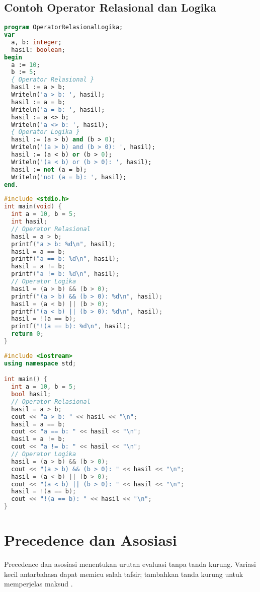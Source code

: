 \documentclass[../main.tex]{subfiles}
\begin{document}
\subsection{Contoh Operator Relasional dan Logika}
\begin{lstlisting}[language=Pascal, caption={Operator relasional dan logika di Pascal}]
program OperatorRelasionalLogika;
var
  a, b: integer;
  hasil: boolean;
begin
  a := 10;
  b := 5;
  { Operator Relasional }
  hasil := a > b;
  Writeln('a > b: ', hasil);
  hasil := a = b;
  Writeln('a = b: ', hasil);
  hasil := a <> b;
  Writeln('a <> b: ', hasil);
  { Operator Logika }
  hasil := (a > b) and (b > 0);
  Writeln('(a > b) and (b > 0): ', hasil);
  hasil := (a < b) or (b > 0);
  Writeln('(a < b) or (b > 0): ', hasil);
  hasil := not (a = b);
  Writeln('not (a = b): ', hasil);
end.
\end{lstlisting}

\begin{lstlisting}[language=C, caption={Operator relasional dan logika di C}]
#include <stdio.h>
int main(void) {
  int a = 10, b = 5;
  int hasil;
  // Operator Relasional
  hasil = a > b;
  printf("a > b: %d\n", hasil);
  hasil = a == b;
  printf("a == b: %d\n", hasil);
  hasil = a != b;
  printf("a != b: %d\n", hasil);
  // Operator Logika
  hasil = (a > b) && (b > 0);
  printf("(a > b) && (b > 0): %d\n", hasil);
  hasil = (a < b) || (b > 0);
  printf("(a < b) || (b > 0): %d\n", hasil);
  hasil = !(a == b);
  printf("!(a == b): %d\n", hasil);
  return 0;
}
\end{lstlisting}

\begin{lstlisting}[language=C++, caption={Operator relasional dan logika di C++}]
#include <iostream>
using namespace std;

int main() {
  int a = 10, b = 5;
  bool hasil;
  // Operator Relasional
  hasil = a > b;
  cout << "a > b: " << hasil << "\n";
  hasil = a == b;
  cout << "a == b: " << hasil << "\n";
  hasil = a != b;
  cout << "a != b: " << hasil << "\n";
  // Operator Logika
  hasil = (a > b) && (b > 0);
  cout << "(a > b) && (b > 0): " << hasil << "\n";
  hasil = (a < b) || (b > 0);
  cout << "(a < b) || (b > 0): " << hasil << "\n";
  hasil = !(a == b);
  cout << "!(a == b): " << hasil << "\n";
}
\end{lstlisting}

\section{Precedence dan Asosiasi}
Precedence dan asosiasi menentukan urutan evaluasi tanpa tanda kurung. Variasi kecil antarbahasa dapat memicu salah tafsir; tambahkan tanda kurung untuk memperjelas maksud \parencite{gnu-c-manual,cpp-op-precedence,c-op-precedence}.
\end{document}
